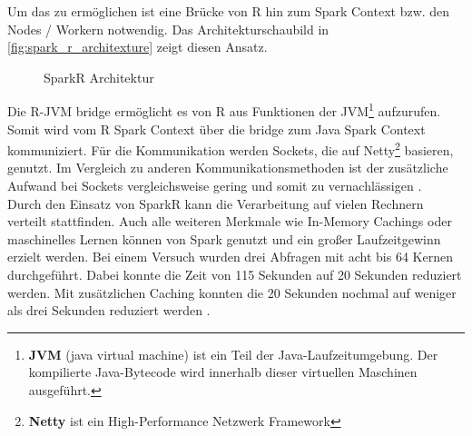 \noindent
Um das zu ermöglichen ist eine Brücke von R hin zum Spark Context bzw. den Nodes / Workern notwendig. Das Architekturschaubild in \autoref{fig:spark_r_architexture} zeigt diesen Ansatz. \\
\begin{figure}[h]
  \centering
  \caption{SparkR Architektur \cite{VYL+16}}\label{fig:spark_r_architexture}
\end{figure}

\noindent
Die R-JVM bridge ermöglicht es von R aus Funktionen der JVM\footnote{\textbf{JVM} (java virtual machine) ist ein Teil der Java-Laufzeitumgebung. Der kompilierte Java-Bytecode wird innerhalb dieser virtuellen Maschinen ausgeführt.} aufzurufen. Somit wird vom R Spark Context über die bridge zum Java Spark Context kommuniziert. Für die Kommunikation werden Sockets, die auf Netty\footnote{\textbf{Netty} ist ein High-Performance Netzwerk Framework} basieren, genutzt. Im Vergleich zu anderen Kommunikationsmethoden ist der zusätzliche Aufwand bei Sockets vergleichsweise gering und somit zu vernachlässigen \cite{VYL+16}. \\

\noindent
Durch den Einsatz von SparkR kann die Verarbeitung auf vielen Rechnern verteilt stattfinden. Auch alle weiteren Merkmale wie In-Memory Cachings oder maschinelles Lernen können von Spark genutzt und ein großer Laufzeitgewinn erzielt werden. Bei einem Versuch wurden drei Abfragen mit acht bis 64 Kernen durchgeführt. Dabei konnte die Zeit von 115 Sekunden auf 20 Sekunden reduziert werden. Mit zusätzlichen Caching konnten die 20 Sekunden nochmal auf weniger als drei Sekunden reduziert werden \cite{VYL+16}.

